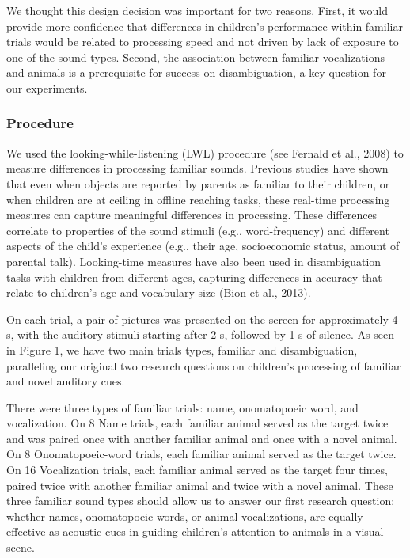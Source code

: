\documentclass[english,floatsintext,man]{apa6}
\theoremstyle{definition}
\theoremstyle{definition}
\theoremstyle{definition}
\theoremstyle{remark}
\begin{document}
We thought this design decision was important for two reasons. First, it
would provide more confidence that differences in children's performance
within familiar trials would be related to processing speed and not
driven by lack of exposure to one of the sound types. Second, the
association between familiar vocalizations and animals is a prerequisite
for success on disambiguation, a key question for our experiments.

\hypertarget{procedure}{%
\subsubsection{Procedure}\label{procedure}}

We used the looking-while-listening (LWL) procedure (see Fernald et al.,
2008) to measure differences in processing familiar sounds. Previous
studies have shown that even when objects are reported by parents as
familiar to their children, or when children are at ceiling in offline
reaching tasks, these real-time processing measures can capture
meaningful differences in processing. These differences correlate to
properties of the sound stimuli (e.g., word-frequency) and different
aspects of the child's experience (e.g., their age, socioeconomic
status, amount of parental talk). Looking-time measures have also been
used in disambiguation tasks with children from different ages,
capturing differences in accuracy that relate to children's age and
vocabulary size (Bion et al., 2013).

On each trial, a pair of pictures was presented on the screen for
approximately 4 s, with the auditory stimuli starting after 2 s,
followed by 1 s of silence. As seen in Figure 1, we have two main trials
types, familiar and disambiguation, paralleling our original two
research questions on children's processing of familiar and novel
auditory cues.

There were three types of familiar trials: name, onomatopoeic word, and
vocalization. On 8 Name trials, each familiar animal served as the
target twice and was paired once with another familiar animal and once
with a novel animal. On 8 Onomatopoeic-word trials, each familiar animal
served as the target twice. On 16 Vocalization trials, each familiar
animal served as the target four times, paired twice with another
familiar animal and twice with a novel animal. These three familiar
sound types should allow us to answer our first research question:
whether names, onomatopoeic words, or animal vocalizations, are equally
effective as acoustic cues in guiding children's attention to animals in
a visual scene.
\end{document}
